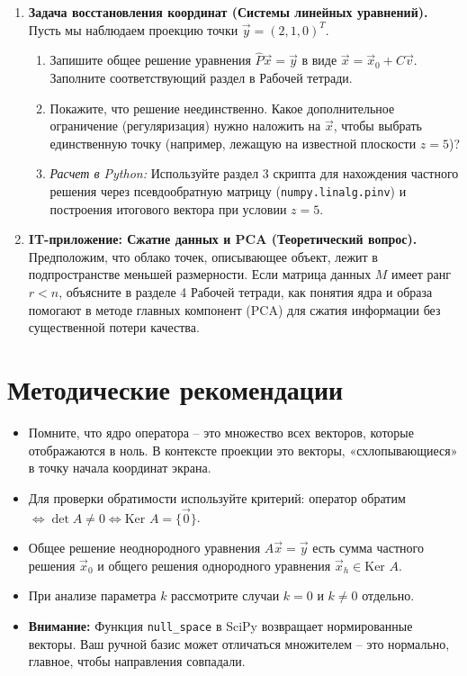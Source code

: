 \documentclass[a4paper,12pt]{article}
\begin{document}
\begin{enumerate}[label=\textbf{\arabic*.}, leftmargin=*]
    \item \textbf{Задача восстановления координат (Системы линейных уравнений).}
    Пусть мы наблюдаем проекцию точки $\vec{y} = (2, 1, 0)^T$.
    \begin{enumerate}[label=\alph*), leftmargin=2em]
        \item Запишите общее решение уравнения $\hat{P}\vec{x} = \vec{y}$ в виде $\vec{x} = \vec{x}_0 + C\vec{v}$. Заполните соответствующий раздел в Рабочей тетради.
        \item Покажите, что решение неединственно. Какое дополнительное ограничение (регуляризация) нужно наложить на $\vec{x}$, чтобы выбрать единственную точку (например, лежащую на известной плоскости $z=5$)?
        \item \textit{Расчет в Python:} Используйте раздел 3 скрипта для нахождения частного решения через псевдообратную матрицу (\texttt{numpy.linalg.pinv}) и построения итогового вектора при условии $z=5$.
    \end{enumerate}

    \item \textbf{IT-приложение: Сжатие данных и PCA (Теоретический вопрос).}
    Предположим, что облако точек, описывающее объект, лежит в подпространстве меньшей размерности. Если матрица данных $M$ имеет ранг $r < n$, объясните в разделе 4 Рабочей тетради, как понятия ядра и образа помогают в методе главных компонент (PCA) для сжатия информации без существенной потери качества.
\end{enumerate}

\section{Методические рекомендации}
\begin{itemize}[label=$\triangleright$]
    \item Помните, что ядро оператора -- это множество всех векторов, которые отображаются в ноль. В контексте проекции это векторы, «схлопывающиеся» в точку начала координат экрана.
    \item Для проверки обратимости используйте критерий: оператор обратим $\iff \det A \neq 0 \iff \text{Ker } A = \{\vec{0}\}$.
    \item Общее решение неоднородного уравнения $A\vec{x}=\vec{y}$ есть сумма частного решения $\vec{x}_0$ и общего решения однородного уравнения $\vec{x}_h \in \text{Ker } A$.
    \item При анализе параметра $k$ рассмотрите случаи $k=0$ и $k \neq 0$ отдельно.
    \item \textbf{Внимание:} Функция \texttt{null\_space} в SciPy возвращает нормированные векторы. Ваш ручной базис может отличаться множителем -- это нормально, главное, чтобы направления совпадали.
\end{itemize}
\end{document}

